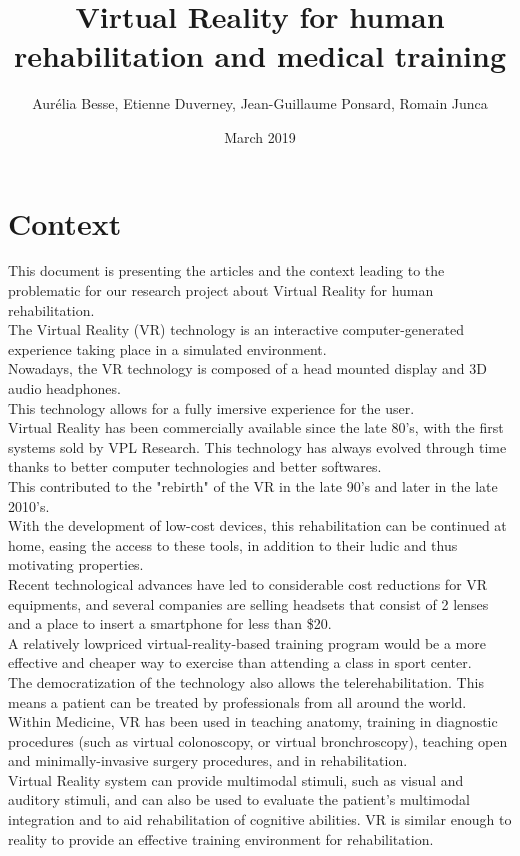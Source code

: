 \documentclass{article}
\title{Virtual Reality for human rehabilitation and medical training}
\author{ Aurélia Besse, Etienne Duverney, Jean-Guillaume Ponsard, Romain Junca }
\date{March 2019}
\begin{document}
\maketitle

\section{Context} 
\hspace{0.5cm}
This document is presenting the articles and the context leading to the problematic for our research project about Virtual Reality for human rehabilitation.
\\

The Virtual Reality (VR) technology is an interactive computer-generated experience taking place in a simulated environment. 
\\
Nowadays, the VR technology is composed of a head mounted display and 3D audio headphones.
\\
This technology allows for a fully imersive experience for the user.
\\

Virtual Reality has been commercially available since the late 80's, with the first systems sold by VPL Research.
This technology has always evolved through time thanks to better computer technologies and better softwares.
\\
This contributed to the "rebirth" of the VR in the late 90's and later in the late 2010's.
\\


With the development of low-cost devices, this rehabilitation can be continued at home, easing the access to these tools, in addition to their ludic and thus motivating properties.
\\ Recent technological advances have led to considerable cost reductions for VR equipments, and several companies are selling headsets that consist of 2 lenses and a place to insert a smartphone for less than \$20.
\\ A relatively lowpriced virtual-reality-based training program would be a more effective and cheaper way to exercise than attending a class in sport center.
\\ The democratization of the technology also allows the telerehabilitation. This means a patient can be treated by professionals from all around the world. 
\\

Within Medicine, VR has been used in teaching anatomy, training in diagnostic procedures (such as virtual colonoscopy, or virtual bronchroscopy), teaching open and minimally-invasive surgery procedures, and in rehabilitation. \\
Virtual Reality system can provide multimodal stimuli, such as visual and auditory stimuli, and can also be used to evaluate the patient’s multimodal integration and to aid rehabilitation of cognitive abilities. 
VR is similar enough to reality to provide an effective training environment for rehabilitation. \\
\end{document}
